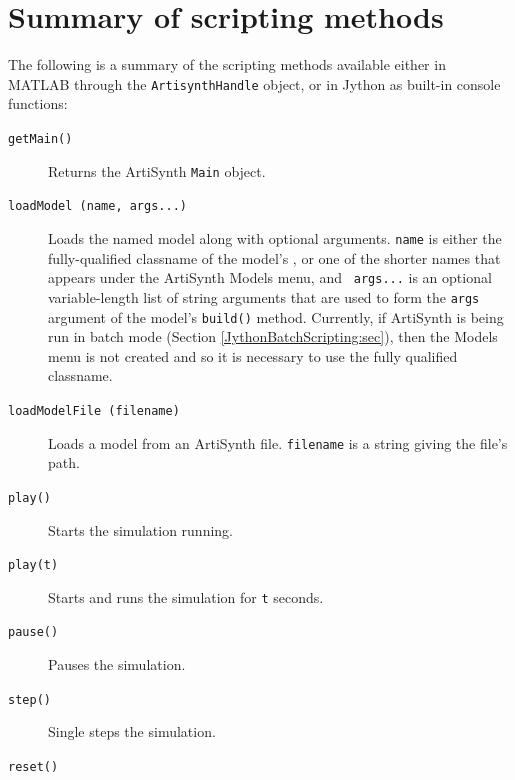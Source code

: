\documentclass{article}
\begin{document}
\section{Summary of scripting methods}
\label{ScriptingMethods:sec}

The following is a summary of the scripting methods available
either in MATLAB through the {\tt ArtisynthHandle} object,
or in Jython as built-in console functions:

\begin{description}

\item[{\tt getMain()} ] \mbox{}

Returns the ArtiSynth {\tt Main} object.

\item[{\tt loadModel (name, args...)} ] \mbox{}

Loads the named model along with optional arguments.  {\tt name} is
either the fully-qualified classname of the model's
, or one of the shorter
names that appears under the ArtiSynth {\sf Models} menu, and {\tt
args...} is an optional variable-length list of string arguments that
are used to form the {\tt args} argument of the model's {\tt build()}
method. Currently, if ArtiSynth is being run in batch mode (Section
\ref{JythonBatchScripting:sec}), then the {\sf Models} menu is not
created and so it is necessary to use the fully qualified classname.

\item[{\tt loadModelFile (filename)} ] \mbox{}

Loads a model from an ArtiSynth file. {\tt filename} is a string
giving the file's path.

\item[{\tt play()} ] \mbox{}

Starts the simulation running.

\item[{\tt play(t)} ] \mbox{}

Starts and runs the simulation for {\tt t} seconds.

\item[{\tt pause()} ] \mbox{}

Pauses the simulation.

\item[{\tt step()} ] \mbox{}

Single steps the simulation.

\item[{\tt reset()} ] \mbox{}


\end{description}
\end{document}
